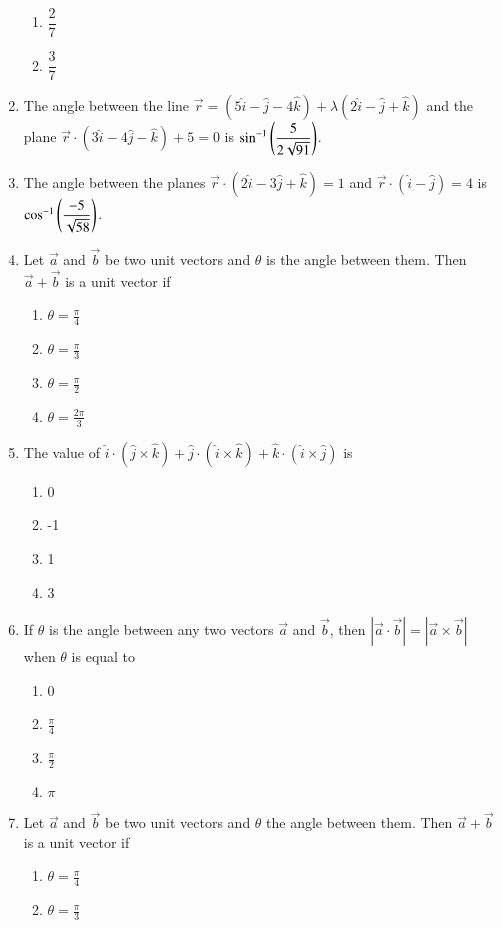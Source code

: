 \begin{enumerate}[label=\thesubsection.\arabic*,ref=\thesubsection.\theenumi]
\begin{enumerate}
	\item  $\dfrac{2}{7}$
	\item  $\dfrac{3}{7}$
\end{enumerate}
\item The angle between the line $\overrightarrow{r}=(5\hat{i}-\hat{j}-4\hat{k})+\lambda(2\hat{i}-\hat{j}+\hat{k})$ and the plane $\overrightarrow{r} \cdot (3\hat{i}-4\hat{j}-\hat{k})+5=0$ is $\sin^{-1}\left(\dfrac{5}{2\sqrt{91}}\right)$.
\item The angle between the planes $\overrightarrow{r} \cdot (2\hat{i}-3\hat{j}+\hat{k})=1$ and $\overrightarrow{r} \cdot (\hat{i}-\hat{j})=4$ is $\cos^{-1} \left(\dfrac{-5}{\sqrt{58}}\right)$.
\item Let $\vec{a}$ and $\vec{b}$ be two unit vectors and $\theta$ is the angle between them. Then $\vec{a}+\vec{b}$ is a unit vector if
\begin{enumerate}
\item $\theta=\frac{\pi}{4}$
\item $\theta=\frac{\pi}{3}$
\item $\theta=\frac{\pi}{2}$
\item $\theta=\frac{2\pi}{3}$
\end{enumerate}
\item The value of $\hat{i}\cdot (\hat{j}\times\hat{k})+\hat{j}\cdot (\hat{i}\times\hat{k})+\hat{k}\cdot (\hat{i}\times\hat{j})$ is
\begin{enumerate}
\item 0
\item -1
\item 1
\item 3
\end{enumerate}
\item If $\theta$ is the angle between any two vectors $\vec{a}$ and $\vec{b}$, then $|\vec{a}\cdot \vec{b}|=|\vec{a}\times\vec{b}|$ when $\theta$ is equal to
\begin{enumerate}
\item 0
\item $\frac{\pi}{4}$
\item $\frac{\pi}{2}$
\item $\pi$
\end{enumerate}
\item Let $\vec{a}$ and $\vec{b}$ be two unit vectors and $\theta$ the angle between them. Then $\vec{a}+\vec{b}$ is a unit vector if
	\begin{enumerate}
			\itemsep2pt
		\item $\theta = \frac{\pi}{4}$
		\item $\theta = \frac{\pi}{3}$

\end{enumerate}
\end{enumerate}
